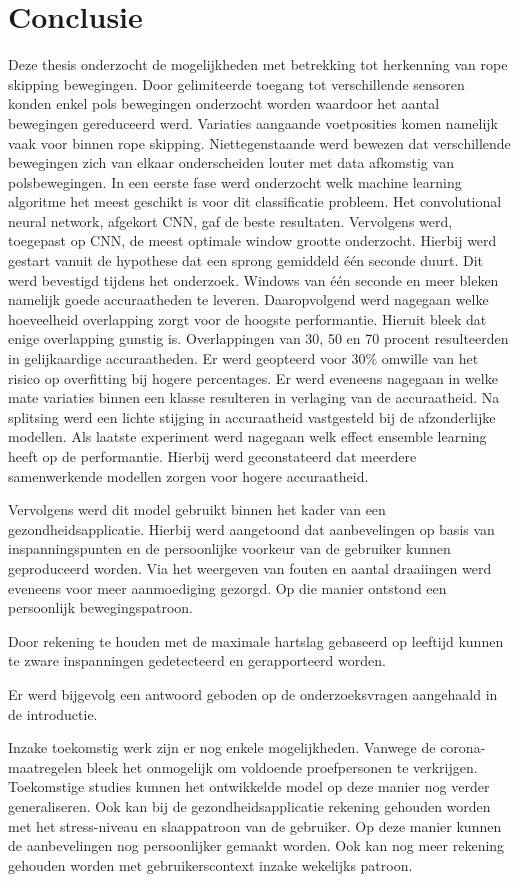 \chapter*{Conclusie}
Deze thesis onderzocht de mogelijkheden met betrekking tot herkenning van rope skipping bewegingen. Door gelimiteerde toegang tot verschillende sensoren konden enkel pols bewegingen onderzocht worden waardoor het aantal bewegingen gereduceerd werd. Variaties aangaande voetposities komen namelijk vaak voor binnen rope skipping.
Niettegenstaande werd bewezen dat verschillende bewegingen zich van elkaar onderscheiden louter met data afkomstig van polsbewegingen. In een eerste fase werd onderzocht welk machine learning algoritme het meest geschikt is voor dit classificatie probleem. Het convolutional neural network, afgekort CNN, gaf de beste resultaten. Vervolgens werd, toegepast op CNN, de meest optimale window grootte onderzocht. Hierbij werd gestart vanuit de hypothese dat een sprong gemiddeld één seconde duurt. Dit werd bevestigd tijdens het onderzoek. Windows van één seconde en meer bleken namelijk goede accuraatheden te leveren. Daaropvolgend werd nagegaan welke hoeveelheid overlapping zorgt voor de hoogste performantie. Hieruit bleek dat enige overlapping gunstig is. Overlappingen van 30, 50 en 70 procent resulteerden in gelijkaardige accuraatheden. Er werd geopteerd voor 30\% omwille van het risico op overfitting bij hogere percentages. 
Er werd eveneens nagegaan in welke mate variaties binnen een klasse resulteren in verlaging van de accuraatheid. Na splitsing werd een lichte stijging in accuraatheid vastgesteld bij de afzonderlijke modellen.
Als laatste experiment werd nagegaan welk effect ensemble learning heeft op de performantie. Hierbij werd geconstateerd dat meerdere samenwerkende modellen zorgen voor hogere accuraatheid.

Vervolgens werd dit model gebruikt binnen het kader van een gezondheidsapplicatie. Hierbij werd aangetoond dat aanbevelingen op basis van inspanningspunten en de persoonlijke voorkeur van de gebruiker kunnen geproduceerd worden. Via het weergeven van fouten en aantal draaiingen werd eveneens voor meer aanmoediging gezorgd. Op die manier ontstond een persoonlijk bewegingspatroon.

Door rekening te houden met de maximale hartslag gebaseerd op leeftijd kunnen te zware inspanningen gedetecteerd en gerapporteerd worden.

Er werd bijgevolg een antwoord geboden op de onderzoeksvragen aangehaald in de introductie.

Inzake toekomstig werk zijn er nog enkele mogelijkheden.
Vanwege de corona-maatregelen bleek het onmogelijk om voldoende proefpersonen te verkrijgen. Toekomstige studies kunnen het ontwikkelde model op deze manier nog verder generaliseren. Ook kan bij de gezondheidsapplicatie rekening gehouden worden met het stress-niveau en slaappatroon van de gebruiker. Op deze manier kunnen de aanbevelingen nog persoonlijker gemaakt worden. Ook kan nog meer rekening gehouden worden met gebruikerscontext inzake wekelijks patroon.